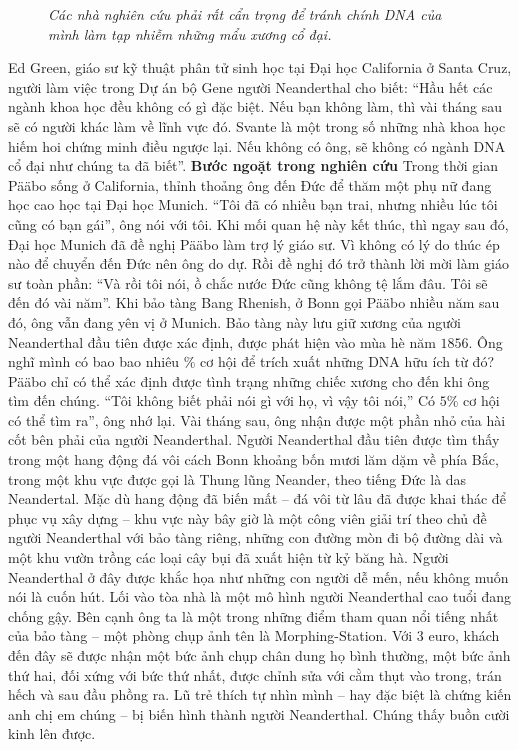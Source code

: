 \begin{multicols}{2}
\begin{figure}[H]
		\caption{\small\textit{\color{timhieukhoahoc}Các nhà nghiên cứu phải rất cẩn trọng để tránh chính DNA của mình làm tạp nhiễm những mẩu xương cổ đại.}}
		\vspace*{-10pt}
	\end{figure}
	Ed Green, giáo sư kỹ thuật phân tử sinh học tại Đại học California ở Santa Cruz, người làm việc trong Dự án bộ Gene người Neanderthal cho biết: “Hầu hết các ngành khoa học đều không có gì đặc biệt. Nếu bạn không làm, thì vài tháng sau sẽ có người khác làm về lĩnh vực đó. Svante là một trong số những nhà khoa học hiếm hoi chứng minh điều ngược lại. Nếu không có ông, sẽ không có ngành DNA cổ đại như chúng ta đã biết”.
	\vskip 0.1cm
	\textbf{\color{timhieukhoahoc}Bước ngoặt trong nghiên cứu}
	\vskip 0.1cm
	Trong thời gian Pääbo sống ở California, thỉnh thoảng ông đến Đức để thăm một phụ nữ đang học cao học tại Đại học Munich. “Tôi đã có nhiều bạn trai, nhưng nhiều lúc tôi cũng có bạn gái”, ông nói với tôi. Khi mối quan hệ này kết thúc, thì ngay sau đó, Đại học Munich đã đề nghị Pääbo làm trợ lý giáo sư. Vì không có lý do thúc ép nào để chuyển đến Đức nên ông do dự. Rồi đề nghị đó trở thành lời mời làm giáo sư toàn phần: “Và rồi tôi nói, ồ chắc nước Đức cũng không tệ lắm đâu. Tôi sẽ đến đó vài năm”.
	\vskip 0.1cm
	Khi bảo tàng Bang Rhenish, ở Bonn gọi Pääbo nhiều năm sau đó, ông vẫn đang yên vị ở Munich. Bảo tàng này lưu giữ xương của người Neanderthal đầu tiên được xác định, được phát hiện vào mùa hè năm $1856$. Ông nghĩ mình có bao bao nhiêu \% cơ hội để trích xuất những DNA hữu ích từ đó? Pääbo chỉ có thể xác định được tình trạng những chiếc xương cho đến khi ông tìm đến chúng.
	\vskip 0.1cm
	“Tôi không biết phải nói gì với họ, vì vậy tôi nói,” Có $5\%$ cơ hội có thể tìm ra”, ông nhớ lại. Vài tháng sau, ông nhận được một phần nhỏ của hài cốt bên phải của người Neanderthal.
	\vskip 0.1cm
	Người Neanderthal đầu tiên được tìm thấy trong một hang động đá vôi cách Bonn khoảng bốn mươi lăm dặm về phía Bắc, trong một khu vực được gọi là Thung lũng Neander, theo tiếng Đức là das Neandertal. Mặc dù hang động đã biến mất -- đá vôi từ lâu đã được khai thác để phục vụ xây dựng -- khu vực này bây giờ là một công viên giải trí theo chủ đề người Neanderthal với bảo tàng riêng, những con đường mòn đi bộ đường dài và một khu vườn trồng các loại cây bụi đã xuất hiện từ kỷ băng hà. Người Neanderthal ở đây được khắc họa như những con người dễ mến, nếu không muốn nói là cuốn hút. Lối vào tòa nhà là một mô hình người Neanderthal cao tuổi đang chống gậy. Bên cạnh ông ta là một trong những điểm tham quan nổi tiếng nhất của bảo tàng -- một phòng chụp ảnh tên là Morphing-Station. Với $3$ euro, khách đến đây sẽ được nhận một bức ảnh chụp chân dung họ bình thường, một bức ảnh thứ hai, đối xứng với bức thứ nhất, được chỉnh sửa với cằm thụt vào trong, trán hếch và sau đầu phồng ra. Lũ trẻ thích tự nhìn mình -- hay đặc biệt là chứng kiến anh chị em chúng -- bị biến hình thành người Neanderthal. Chúng thấy buồn cười kinh lên được.

\end{multicols}
